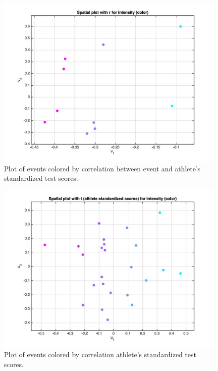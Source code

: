 \documentclass[12pt]{exam}
\begin{document}
\begin{questions}
   \begin{figure}[hpb!]
    \centering
    \includegraphics[scale=0.3]{data/intensity_plot.jpg}
    \caption{Plot of events colored by correlation between event and athlete's standardized test scores.}
    \label{fig:intensity_plot}
  \end{figure}

   \begin{figure}[hpb!]
    \centering
    \includegraphics[scale=0.3]{data/spatial_t.jpg}
    \caption{Plot of events colored by correlation athlete's standardized test scores.}
    \label{fig:intensity_plot_t}
  \end{figure}


\end{questions}
\end{document}
